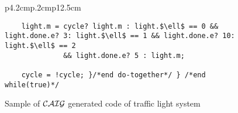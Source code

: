 \begin{figure}
\begin{tabular}{p{4.2cm}p{.2cm}p{12.5cm}}
\begin{lstlisting}
    light.m = cycle? light.m : light.$\ell$ == 0 && light.done.e? 3: light.$\ell$ == 1 && light.done.e? 10: light.$\ell$ == 2 
              && light.done.e? 5 : light.m; 
    
    cycle = !cycle; }/*end do-together*/ } /*end while(true)*/
\end{lstlisting}
\end{tabular}
\vspace{-2em}
\caption{Sample of $\mathcal{CAIG}$ generated code of traffic light system}
\label{fig:caigtraffic}
\end{figure}
